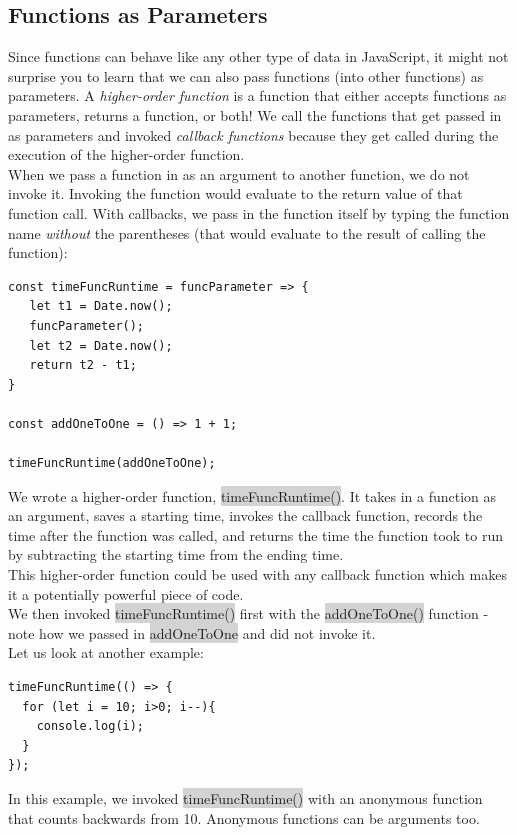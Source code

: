 \documentclass[11pt]{article}
\begin{document}
\subsection{Functions as Parameters}
Since functions can behave like any other type of data in JavaScript, it might not surprise you to learn that we can also pass functions (into other functions) as parameters. A \textit{higher-order function} is a function that either accepts functions as parameters, returns a function, or both! We call the functions that get passed in as parameters and invoked \textit{callback functions} because they get called during the execution of the higher-order function. \\
\newline
When we pass a function in as an argument to another function, we do not invoke it. Invoking the function would evaluate to the return value of that function call. With callbacks, we pass in the function itself by typing the function name \textit{without} the parentheses (that would evaluate to the result of calling the function):
\begin{lstlisting}
const timeFuncRuntime = funcParameter => {
   let t1 = Date.now();
   funcParameter();
   let t2 = Date.now();
   return t2 - t1;
}

const addOneToOne = () => 1 + 1;

timeFuncRuntime(addOneToOne);
\end{lstlisting}
We wrote a higher-order function, \colorbox{lightgray}{timeFuncRuntime()}. It takes in a function as an argument, saves a starting time, invokes the callback function, records the time after the function was called, and returns the time the function took to run by subtracting the starting time from the ending time. \\
\newline
This higher-order function could be used with any callback function which makes it a potentially powerful piece of code. \\
\newline
We then invoked \colorbox{lightgray}{timeFuncRuntime()} first with the \colorbox{lightgray}{addOneToOne()} function - note how we passed in \colorbox{lightgray}{addOneToOne} and did not invoke it. \\
\newpage
Let us look at another example: 
\begin{lstlisting}
timeFuncRuntime(() => {
  for (let i = 10; i>0; i--){
    console.log(i);
  }
});
\end{lstlisting}
In this example, we invoked \colorbox{lightgray}{timeFuncRuntime()} with an anonymous function that counts backwards from 10. Anonymous functions can be arguments too.
\end{document}
